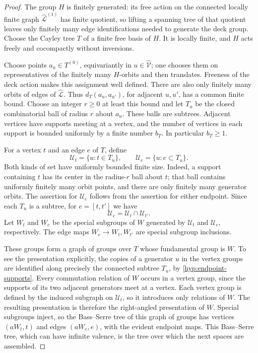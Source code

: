 \begin{proof}
The group \(H\) is finitely generated: its free action on the connected
locally finite graph \(\widehat{\mathcal L}^{(1)}\) has finite quotient,
so lifting a spanning tree of that quotient leaves only finitely many
edge identifications needed to generate the deck group.  Choose the
Cayley tree \(T\) of a finite free basis of \(H\).  It is locally finite,
and \(H\) acts freely and cocompactly without inversions.

Choose points \(a_u\in T^{(0)}\), equivariantly in
\(u\in\widehat{\mathcal V}\); one chooses them on representatives of
the finitely many \(H\)-orbits and then translates.  Freeness of the
deck action makes this assignment well defined.  There are also only
finitely many orbits of edges of \(\widehat{\mathcal L}\).  Thus
\(d_T(a_u,a_{u'})\), for adjacent \(u,u'\), has a common finite bound.
Choose an integer \(r\geq 0\) at least this bound and let \(T_u\) be the
closed combinatorial ball of radius \(r\) about \(a_u\).  These balls
are subtrees.  Adjacent vertices have supports meeting at a vertex,
and the number of vertices in each support is bounded uniformly by a
finite number \(b_T\).  In particular \(b_T\geq 1\).

For a vertex \(t\) and an edge \(e\) of \(T\), define
\[
\mathcal U_t=\{u:t\in T_u\},\qquad
\mathcal U_e=\{u:e\subset T_u\}.
\]
Both kinds of set have uniformly bounded finite size.  Indeed, a
support containing \(t\) has its center in the radius-\(r\) ball about
\(t\); that ball contains uniformly finitely many orbit points, and
there are only finitely many generator orbits.  The assertion for
\(\mathcal U_e\) follows from the assertion for either endpoint.
Since each \(T_u\) is a subtree, for \(e=[t,t']\) we have
\begin{equation}
\mathcal U_e=\mathcal U_t\cap\mathcal U_{t'}.
\label{hyp:endpoint-supports}
\end{equation}
Let \(W_t\) and \(W_e\) be the special subgroups of \(W\) generated by
\(\mathcal U_t\) and \(\mathcal U_e\), respectively.  The edge maps
\(W_e\longrightarrow W_t,W_{t'}\) are special subgroup inclusions.

These groups form a graph of groups over \(T\) whose fundamental group
is \(W\).  To see the presentation explicitly, the copies of a
generator \(u\) in the vertex groups are identified along precisely
the connected subtree \(T_u\), by \eqref{hyp:endpoint-supports}.
Every commutation relation of \(W\) occurs in a vertex group, since
the supports of its two adjacent generators meet at a vertex.  Each
vertex group is defined by the induced subgraph on \(\mathcal U_t\),
so it introduces only relations of \(W\).  The resulting presentation
is therefore the right-angled presentation of \(W\).  Special
subgroups inject, so the Bass--Serre tree of this graph of groups has
vertices \((aW_t,t)\) and edges \((aW_e,e)\), with the evident endpoint
maps.  This Bass--Serre tree, which can have infinite valence, is the
tree over which the next spaces are assembled.


\end{proof}
